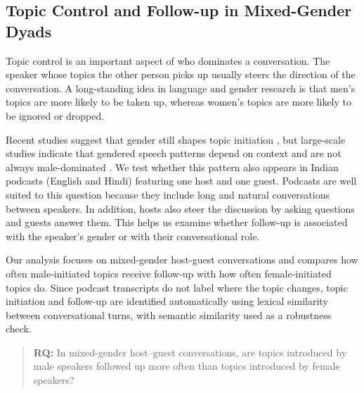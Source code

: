 
\subsection*{Topic Control and Follow-up in Mixed-Gender Dyads}

Topic control is an important aspect of who dominates a conversation. The speaker whose topics the other person picks up usually steers the direction of the conversation. A long-standing idea in language and gender research is that men's topics are more likely to be taken up, whereas women's topics are more likely to be ignored or dropped.

Recent studies suggest that gender still shapes topic initiation \cite{TopicInitiationbyKoreanandChineseSpeakersonRealityDatingShows}, but large-scale studies indicate that gendered speech patterns depend on context and are not always male-dominated \cite{yoo2022conversational}. We test whether this pattern also appears in Indian podcasts (English and Hindi) featuring one host and one guest. Podcasts are well suited to this question because they include long and natural conversations between speakers. In addition, hosts also steer the discussion by asking questions and guests answer them. This helps us examine whether follow-up is associated with the speaker's gender or with their conversational role.

Our analysis focuses on mixed-gender host-guest conversations and compares how often male-initiated topics receive follow-up with how often female-initiated topics do. Since podcast transcripts do not label where the topic changes, topic initiation and follow-up are identified automatically using lexical similarity between conversational turns, with semantic similarity used as a robustness check.

\begin{quote}
\textbf{RQ:} In mixed-gender host--guest conversations, are topics introduced by male speakers followed up more often than topics introduced by female speakers?
\vspace{-0.8em}
\end{quote}

